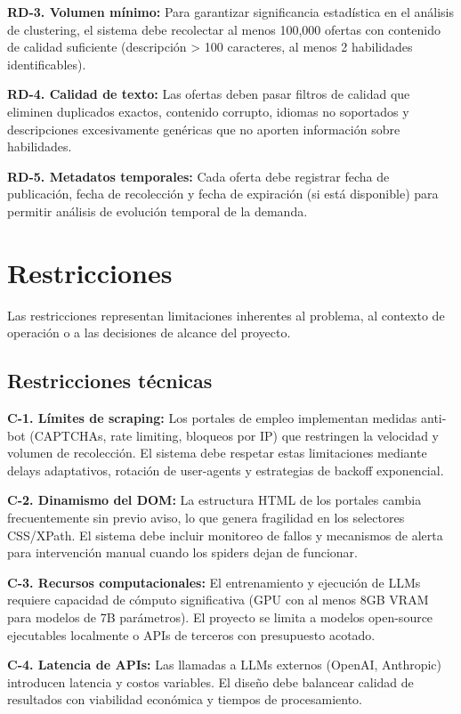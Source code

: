 \textbf{RD-3. Volumen mínimo:} Para garantizar significancia estadística en el análisis de clustering, el sistema debe recolectar al menos 100,000 ofertas con contenido de calidad suficiente (descripción > 100 caracteres, al menos 2 habilidades identificables).

\textbf{RD-4. Calidad de texto:} Las ofertas deben pasar filtros de calidad que eliminen duplicados exactos, contenido corrupto, idiomas no soportados y descripciones excesivamente genéricas que no aporten información sobre habilidades.

\textbf{RD-5. Metadatos temporales:} Cada oferta debe registrar fecha de publicación, fecha de recolección y fecha de expiración (si está disponible) para permitir análisis de evolución temporal de la demanda.

\section{Restricciones}

Las restricciones representan limitaciones inherentes al problema, al contexto de operación o a las decisiones de alcance del proyecto.

\subsection{Restricciones técnicas}

\textbf{C-1. Límites de scraping:} Los portales de empleo implementan medidas anti-bot (CAPTCHAs, rate limiting, bloqueos por IP) que restringen la velocidad y volumen de recolección. El sistema debe respetar estas limitaciones mediante delays adaptativos, rotación de user-agents y estrategias de backoff exponencial.

\textbf{C-2. Dinamismo del DOM:} La estructura HTML de los portales cambia frecuentemente sin previo aviso, lo que genera fragilidad en los selectores CSS/XPath. El sistema debe incluir monitoreo de fallos y mecanismos de alerta para intervención manual cuando los spiders dejan de funcionar.

\textbf{C-3. Recursos computacionales:} El entrenamiento y ejecución de LLMs requiere capacidad de cómputo significativa (GPU con al menos 8GB VRAM para modelos de 7B parámetros). El proyecto se limita a modelos open-source ejecutables localmente o APIs de terceros con presupuesto acotado.

\textbf{C-4. Latencia de APIs:} Las llamadas a LLMs externos (OpenAI, Anthropic) introducen latencia y costos variables. El diseño debe balancear calidad de resultados con viabilidad económica y tiempos de procesamiento.

